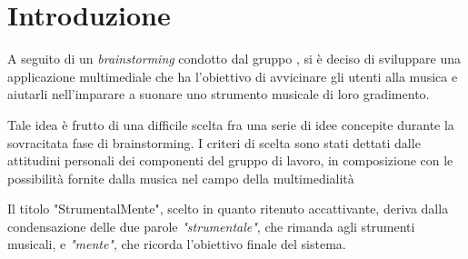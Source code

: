 \section{Introduzione}
A seguito di un \textit{brainstorming} condotto dal gruppo \theteam{}, si è deciso di sviluppare una applicazione multimediale che ha l'obiettivo di avvicinare gli utenti alla musica e aiutarli nell'imparare a suonare uno strumento musicale di loro gradimento.

Tale idea è frutto di una difficile scelta fra una serie di idee concepite durante la sovracitata fase di brainstorming. I criteri di scelta sono stati dettati dalle attitudini personali dei componenti del gruppo di lavoro, in composizione con le possibilità fornite dalla musica nel campo della multimedialità

Il titolo "StrumentalMente", scelto in quanto ritenuto accattivante, deriva dalla condensazione delle due parole \emph{"strumentale"}, che rimanda agli strumenti musicali, e \emph{"mente"}, che ricorda l'obiettivo finale del sistema.